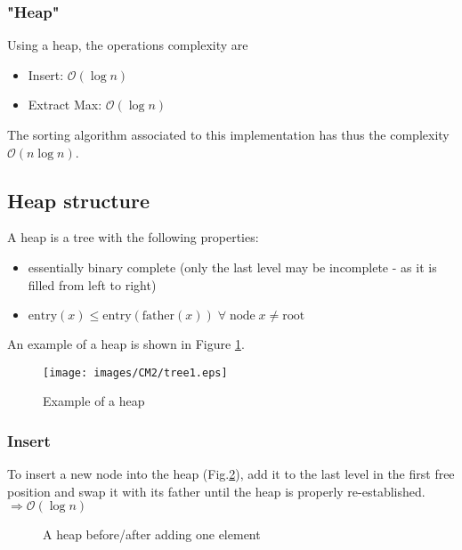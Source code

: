 \subsubsection{"Heap"} Using a heap, the operations complexity are \begin{itemize}
\item Insert: $\mathcal{O}(\log n)$
\item Extract Max: $\mathcal{O}(\log n)$
\end{itemize}
The sorting algorithm associated to this implementation has thus the complexity $\mathcal{O} (n \log n)$.

\subsection{Heap structure}

A heap is a tree with the following properties:
\begin{itemize}
\item essentially binary complete (only the last level may be incomplete - as it is filled from left to right)
\item $\text{entry}(x) \leq \text{entry}(\text{father}(x)) \; \forall \; \text{node} \; x \neq \text{root}$
\end{itemize}
An example of a heap is shown in Figure \ref{cm2:tree1}.

\begin{figure}[h!]
\centering
\texttt{[image: images/CM2/tree1.eps]}
\caption{Example of a heap}
\label{cm2:tree1}
\end{figure}

\subsubsection{Insert} 
To insert a new node into the heap (Fig.\ref{cm2:tree2_3}), add it to the last level in the first free position and swap it with its father until the heap is properly re-established. \newline
$\Rightarrow \mathcal{O}(\log n)$\\

\begin{figure}[htbp]
\centering
{}
\caption{A heap before/after adding one element}
\label{cm2:tree2_3}
\end{figure}

